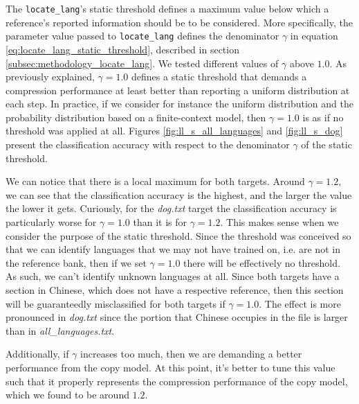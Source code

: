 \documentclass{article}
\begin{document}
The \texttt{locate\_lang}'s static threshold defines a maximum value below which a reference's reported information should be to be considered.
More specifically, the parameter value passed to \texttt{locate\_lang} defines the denominator $\gamma$ in equation \ref{eq:locate_lang_static_threshold}, described in section \ref{subsec:methodology_locate_lang}.
We tested different values of $\gamma$ above $1.0$.
As previously explained, $\gamma = 1.0$ defines a static threshold that demands a compression performance at least better than reporting a uniform distribution at each step.
In practice, if we consider for instance the uniform distribution and the probability distribution based on a finite-context model, then $\gamma = 1.0$ is as if no threshold was applied at all.
Figures \ref{fig:ll_s_all_languages} and \ref{fig:ll_s_dog} present the classification accuracy with respect to the denominator $\gamma$ of the static threshold.

We can notice that there is a local maximum for both targets.
Around $\gamma = 1.2$, we can see that the classification accuracy is the highest, and the larger the value the lower it gets.
Curiously, for the \textit{dog.txt} target the classification accuracy is particularly worse for $\gamma = 1.0$ than it is for $\gamma = 1.2$.
This makes sense when we consider the purpose of the static threshold.
Since the threshold was conceived so that we can identify languages that we may not have trained on, i.e. are not in the reference bank, then if we set $\gamma = 1.0$ there will be effectively no threshold.
As such, we can't identify unknown languages at all.
Since both targets have a section in Chinese, which does not have a respective reference, then this section will be guaranteedly misclassified for both targets if $\gamma = 1.0$.
The effect is more pronounced in \textit{dog.txt} since the portion that Chinese occupies in the file is larger than in \textit{all\_languages.txt}.

Additionally, if $\gamma$ increases too much, then we are demanding a better performance from the copy model.
At this point, it's better to tune this value such that it properly represents the compression performance of the copy model, which we found to be around $1.2$.
\end{document}
